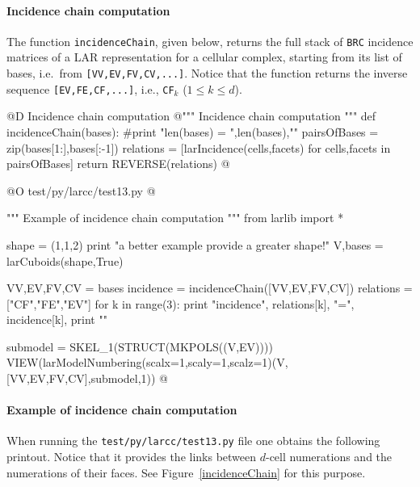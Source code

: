 \documentclass[11pt,oneside]{article}    %
\begin{document}
\paragraph{Incidence chain computation}
The function \texttt{incidenceChain}, given below, returns the full stack of \texttt{BRC} incidence matrices of a LAR representation for a cellular complex, starting from its list of bases, i.e.~from \texttt{[VV,EV,FV,CV,...]}. Notice that the function returns the inverse sequence 
\texttt{[EV,FE,CF,...]}, i.e., \texttt{CF}$_k$ ($1\leq k\leq d$).

@D Incidence chain computation
@{""" Incidence chain computation """
def incidenceChain(bases):
    #print "\n len(bases) = ",len(bases),"\n"
    pairsOfBases = zip(bases[1:],bases[:-1])
    relations = [larIncidence(cells,facets) 
                    for cells,facets in pairsOfBases]
    return REVERSE(relations)
@}

@O test/py/larcc/test13.py
@{""" Example of incidence chain computation """
from larlib import *

shape = (1,1,2) 
print "\n\nFor a better example provide a greater shape!"
V,bases = larCuboids(shape,True)

VV,EV,FV,CV = bases
incidence = incidenceChain([VV,EV,FV,CV])
relations = ["CF","FE","EV"]
for k in range(3):
    print "\n\n incidence", relations[k], "=\n", incidence[k],
print "\n\n"

submodel = SKEL_1(STRUCT(MKPOLS((V,EV))))
VIEW(larModelNumbering(scalx=1,scaly=1,scalz=1)(V,[VV,EV,FV,CV],submodel,1))
@}


\paragraph{Example of incidence chain computation}
When running the \texttt{test/py/larcc/test13.py} file one obtains the following printout. 
Notice that 
it provides the links between $d$-cell numerations and the numerations of their faces.
See Figure~\ref{incidenceChain} for this purpose.
\end{document}
